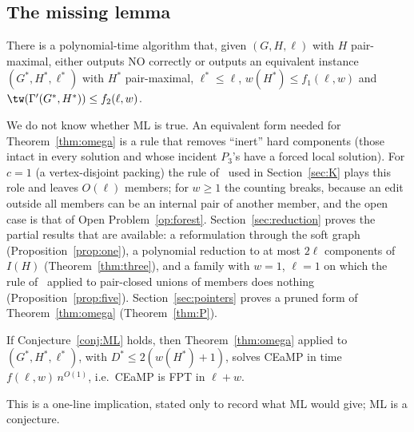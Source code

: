 \subsection{The missing lemma}
\begin{conjecture}\label{conj:ML}
There is a polynomial-time algorithm that, given $(G,H,\ell)$ with $H$ pair-maximal, either outputs NO correctly or outputs an equivalent instance $(G^*,H^*,\ell^*)$ with $H^*$ pair-maximal, $\ell^*\le\ell$, $w(H^*)\le f_1(\ell,w)$ and $\tw(\Gamma'(G^*,H^*))\le f_2(\ell,w)$.
\end{conjecture}
We do not know whether ML is true. An equivalent form needed for Theorem~\ref{thm:omega} is a rule that removes ``inert'' hard components (those intact in every solution and whose incident $P_3$'s have a forced local solution). For $c=1$ (a vertex-disjoint packing) the rule of~\cite{BFK18} used in Section~\ref{sec:K} plays this role and leaves $O(\ell)$ members; for $w\ge1$ the counting breaks, because an edit outside all members can be an internal pair of another member, and the open case is that of Open Problem~\ref{op:forest}. Section~\ref{sec:reduction} proves the partial results that are available: a reformulation through the soft graph (Proposition~\ref{prop:one}), a polynomial reduction to at most $2\ell$ components of $I(H)$ (Theorem~\ref{thm:three}), and a family with $w=1$, $\ell=1$ on which the rule of~\cite{BFK18} applied to pair-closed unions of members does nothing (Proposition~\ref{prop:five}). Section~\ref{sec:pointers} proves a pruned form of Theorem~\ref{thm:omega} (Theorem~\ref{thm:P}).
\begin{observation}\label{obs:cond}
If Conjecture~\ref{conj:ML} holds, then Theorem~\ref{thm:omega} applied to $(G^*,H^*,\ell^*)$, with $D^*\le2(w(H^*)+1)$, solves CEaMP in time $f(\ell,w)\,n^{O(1)}$, i.e.\ CEaMP is FPT in $\ell+w$.
\end{observation}
This is a one-line implication, stated only to record what ML would give; ML is a conjecture.

